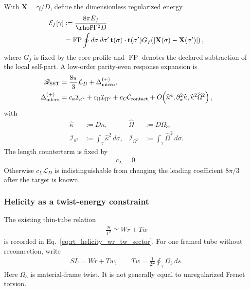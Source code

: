 With \(\mathbf X=\boldsymbol\gamma/D\), define the dimensionless regularized
energy
\begin{align}
    \mathcal E_f[\gamma]
    &:=
    \frac{8\pi E_f}{\rhoF\Gamma^2D}
    \nonumber\\
    &=
    \operatorname{FP}
    \oint d\sigma\,d\sigma'\,
    \mathbf t(\sigma)\cdot\mathbf t(\sigma')
    G_f\!\left(
        |\mathbf X(\sigma)-\mathbf X(\sigma')|
    \right),
    \label{eq:rt_alpha_regularized_vortex_energy_v0835}
\end{align}
where \(G_f\) is fixed by the core profile and
\(\operatorname{FP}\) denotes the declared subtraction of the local self-part.
A low-order parity-even response expansion is
\begin{align}
    \mathscr R_{\rm SST}
    &=
    \frac{8\pi}{3}\mathcal L_D
    +
    \Delta_{\rm micro}^{(+)},
    \\
    \Delta_{\rm micro}^{(+)}
    &=
    c_\kappa\mathcal I_{\kappa^2}
    +
    c_\Omega\mathcal I_{\Omega^2}
    +
    c_C\mathcal C_{\rm contact}
    +
    O\!\left(
        \widehat\kappa^4,
        \partial_\sigma^2\widehat\kappa,
        \widehat\kappa^2\widehat\Omega^2
    \right),
    \label{eq:rt_alpha_finite_core_response_v0835}
\end{align}
with
\begin{align}
    \widehat\kappa&:=D\kappa,
    &
    \widehat\Omega&:=D\Omega_3,
    \\
    \mathcal I_{\kappa^2}
    &:=
    \int_\gamma\widehat\kappa^2\,d\sigma,
    &
    \mathcal I_{\Omega^2}
    &:=
    \int_\gamma\widehat\Omega^2\,d\sigma.
\end{align}
The length counterterm is fixed by
\begin{align}
    \boxed{c_L=0}.
    \label{eq:rt_alpha_length_renormalization_v0835}
\end{align}
Otherwise \(c_L\mathcal L_D\) is indistinguishable from changing the leading
coefficient \(8\pi/3\) after the target is known.

\subsubsection{Helicity as a twist-energy constraint}

The existing thin-tube relation
\begin{align}
    \frac{\mathcal H}{\Gamma^2}
    \simeq
    Wr+Tw
\end{align}
is recorded in Eq.~\eqref{eq:rt_helicity_wr_tw_sector}.  For one framed tube
without reconnection, write
\begin{align}
    SL
    =
    Wr+Tw,
    \qquad
    Tw
    =
    \frac{1}{2\pi}
    \oint_\gamma\Omega_3\,ds.
    \label{eq:rt_alpha_selflink_twist_v0835}
\end{align}
Here \(\Omega_3\) is material-frame twist.  It is not generally equal to
unregularized Frenet torsion.

